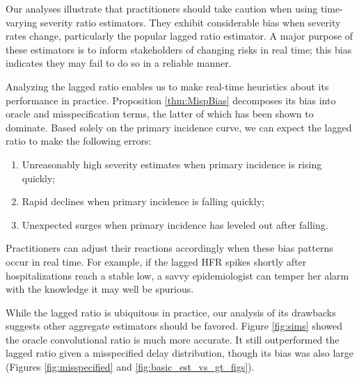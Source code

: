 \documentclass{article}
\begin{document}
Our analyses illustrate that practitioners should take caution when using
time-varying severity ratio estimators. They exhibit considerable bias when severity rates
change, particularly the popular lagged ratio estimator. A major purpose of these
estimators is to inform stakeholders of changing risks in real time; this bias
indicates they may fail to do so in a reliable manner.

Analyzing the lagged ratio enables us to make real-time heuristics about its performance in practice. Proposition \ref{thm:MispBias} decomposes its bias into oracle and misspecification terms, the latter of which has been shown to dominate. Based solely on the primary incidence curve, we can expect the lagged ratio to make the following errors:
\begin{enumerate}
    \item Unreasonably high severity estimates when primary incidence is rising quickly;
    \item Rapid declines when primary incidence is falling quickly;
    \item Unexpected surges when primary incidence has leveled out after falling. 
\end{enumerate}

Practitioners can adjust their reactions accordingly when these bias patterns occur in real time. For example, if the lagged HFR spikes shortly after hospitalizations reach a stable low, a savvy epidemiologist can temper her alarm with the knowledge it may well be spurious.

While the lagged ratio is ubiquitous in practice, our analysis of its
drawbacks suggests other aggregate estimators should be favored. Figure
\ref{fig:sims} showed the oracle convolutional ratio is much more
accurate. 
It still outperformed the lagged ratio given a misspecified delay distribution, though its bias was also large (Figures \ref{fig:misspecified} and \ref{fig:basic_est_vs_gt_figs}).
\end{document}
